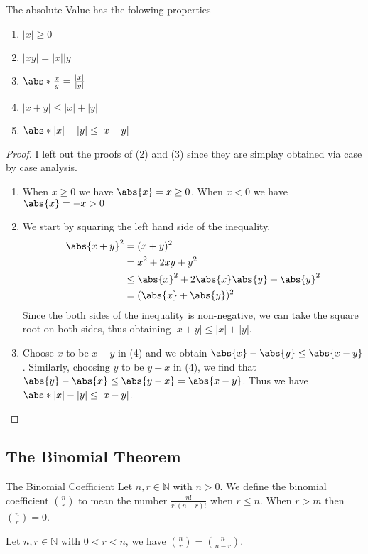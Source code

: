 \begin{prp}{}{} The absolute Value has the folowing properties
\begin{enumerate}
\item $|x|\geq0$
\item $|xy|=|x||y|$
\item $\abs*{\frac{x}{y}}=\frac{|x|}{|y|}$
\item $|x+y|\leq|x|+|y|$
\item $\abs*{|x|-|y|}\leq|x-y|$
\end{enumerate}
\end{prp}
\begin{proof}  I left out the proofs of (2) and (3) since they are simplay obtained via case by case analysis. 
\begin{enumerate}
\item When $x\geq0$ we have $\abs{x}=x\geq0$. When $x<0$ we have $\abs{x}=-x>0$
\item We start by squaring the left hand side of the inequality. 
\begin{align*}
\abs{x+y}^2&=(x+y)^2 \\
&=x^2+2xy+y^2 \\
&\leq \abs{x}^2+2\abs{x}\abs{y}+\abs{y}^2 \\
&=(\abs{x}+\abs{y})^2
\end{align*}
Since the both sides of the inequality is non-negative, we can take the square root on both sides, thus obtaining $|x+y|\leq|x|+|y|$. 
\item Choose $x$ to be $x-y$ in (4) and we obtain $\abs{x}-\abs{y}\leq\abs{x-y}$. Similarly, choosing $y$ to be $y-x$ in (4), we find that $\abs{y}-\abs{x}\leq\abs{y-x}=\abs{x-y}$. Thus we have $\abs*{|x|-|y|}\leq|x-y|$. 
\end{enumerate}
\end{proof}

\subsection{The Binomial Theorem}
\begin{defn}{The Binomial Coefficient}{} Let $n,r\in\mathbb{N}$ with $n>0$. We define the binomial coefficient $\binom{n}{r}$ to mean the number $\frac{n!}{r!(n-r)!}$ when $r\leq n$. When $r>m$ then $\binom{n}{r}=0$. 
\end{defn}

\begin{prp}{}{} Let $n,r\in\mathbb{N}$ with $0<r<n$, we have $\binom{n}{r}=\binom{n}{n-r}$. 
\end{prp}

